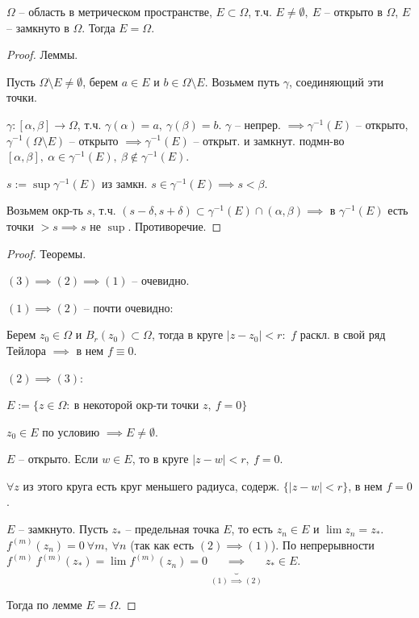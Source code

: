 \begin{lemma}
    $\Omega$ -- область в метрическом пространстве, $E \subset \Omega$, т.ч. $E \not = \emptyset, \ E$ -- открыто в $\Omega$, $E$ -- замкнуто в $\Omega$. Тогда $E = \Omega$.
\end{lemma}
\begin{proof} Леммы.

    Пусть $\Omega \setminus E \not = \emptyset$, берем $a \in E$ и $b \in \Omega \setminus E$. Возьмем путь $\gamma$, соединяющий эти точки.

    $\gamma: [\alpha, \beta] \rightarrow \Omega$, т.ч. $\gamma(\alpha) = a, \ \gamma(\beta) = b$. $\gamma$ -- непрер. $\implies \gamma^{-1} (E)$ -- открыто, $\gamma^{-1}(\Omega \setminus E)$ -- открыто $\implies \gamma^{-1}(E)$ -- открыт. и замкнут. подмн-во $[\alpha, \beta], \ \alpha \in \gamma^{-1}(E), \ \beta \not \in \gamma^{-1}(E)$.

    $s := \sup{\gamma^{-1} (E)}$ из замкн. $s \in \gamma^{-1} (E) \implies s < \beta$.


    Возьмем окр-ть $s$, т.ч. $(s - \delta, s + \delta) \subset \gamma^{-1}(E) \cap (\alpha, \beta) \implies $ в $\gamma^{-1}(E)$ есть точки $> s \implies s $ не $\sup$. Противоречие.
\end{proof}

\begin{proof}
    Теоремы.

    $(3) \implies (2) \implies (1)$ -- очевидно.

    $(1) \implies (2)$ -- почти очевидно:

    Берем $z_0 \in \Omega$ и $B_r(z_0) \subset \Omega$, тогда в круге $|z - z_0| < r: $ $f$ раскл. в свой ряд Тейлора $\implies$ в нем $f \equiv 0$.

    $(2) \implies (3)$:

    $E := \{ z \in \Omega: \ \text{в некоторой окр-ти точки } z, \ f = 0 \}$

    $z_0 \in E$ по условию $\implies E \not = \emptyset$.

    $E$ -- открыто. Если $w \in E$, то в круге $|z - w| < r, \ f = 0$.

    $\forall z$ из этого круга есть круг меньшего радиуса, содерж. $\{ |z - w| < r \}$, в нем $f = 0$.

    $E$ -- замкнуто. Пусть $z_*$ -- предельная точка $E$, то есть $z_n \in E$ и $\lim{z_n} = z_*$. $f^{(m)} (z_n) = 0 \ \forall m, \ \forall n$ (так как есть $(2) \implies (1)$). По непрерывности $f^{(m)} \ f^{(m)} (z_*) = \lim{f^{(m)} (z_n)} = 0 \underbrace{\implies}_{(1) \implies (2)} z_* \in E$.

    Тогда по лемме $E = \Omega$.
\end{proof}



